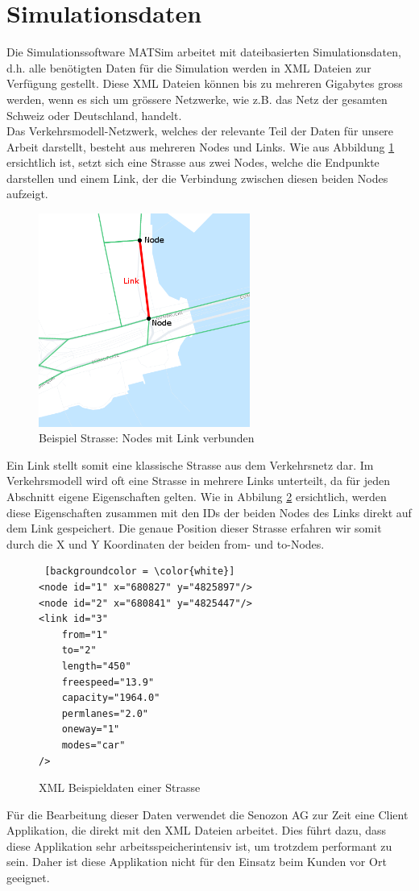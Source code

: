 \section{Simulationsdaten}
Die Simulationssoftware MATSim arbeitet mit dateibasierten Simulationsdaten, d.h. alle benötigten Daten für die Simulation werden in XML Dateien zur Verfügung gestellt. Diese XML Dateien können bis zu mehreren Gigabytes gross werden, wenn es sich um grössere Netzwerke, wie z.B. das Netz der gesamten Schweiz oder Deutschland, handelt.\\
Das Verkehrsmodell-Netzwerk, welches der relevante Teil der Daten für unsere Arbeit darstellt, besteht aus mehreren Nodes und Links. Wie aus Abbildung \ref{example_street} ersichtlich ist, setzt sich eine Strasse aus zwei Nodes, welche die Endpunkte darstellen und einem Link, der die Verbindung zwischen diesen beiden Nodes aufzeigt.
\begin{figure}[H]
\centering
\includegraphics[height=7cm]{images/Link_demo_edited.PNG}
\caption{Beispiel Strasse: Nodes mit Link verbunden}
\label{example_street}
\end{figure}
\noindent
Ein Link stellt somit eine klassische Strasse aus dem Verkehrsnetz dar. Im Verkehrsmodell wird oft eine Strasse in mehrere Links unterteilt, da für jeden Abschnitt eigene Eigenschaften gelten. Wie in Abbilung \ref{street_details} ersichtlich, werden diese Eigenschaften zusammen mit den IDs der beiden Nodes des Links direkt auf dem Link gespeichert. Die genaue Position dieser Strasse erfahren wir somit durch die X und Y Koordinaten der beiden \glqq{}from\grqq{}- und \glqq{}to\grqq{}-Nodes.
\begin{figure}[H]
\centering
\lstset{language=XML}
\begin{lstlisting} [backgroundcolor = \color{white}]
<node id="1" x="680827" y="4825897"/>
<node id="2" x="680841" y="4825447"/>
<link id="3" 
	from="1" 
	to="2" 
	length="450" 
	freespeed="13.9" 
	capacity="1964.0" 
	permlanes="2.0" 
	oneway="1" 
	modes="car"
/>
\end{lstlisting}
\caption{XML Beispieldaten einer Strasse}
\label{street_details}
\end{figure}
\noindent
Für die Bearbeitung dieser Daten verwendet die Senozon AG zur Zeit eine Client Applikation, die direkt mit den XML Dateien arbeitet. Dies führt dazu, dass diese Applikation sehr arbeitsspeicherintensiv ist, um trotzdem performant zu sein. Daher ist diese Applikation nicht für den Einsatz beim Kunden vor Ort geeignet.
